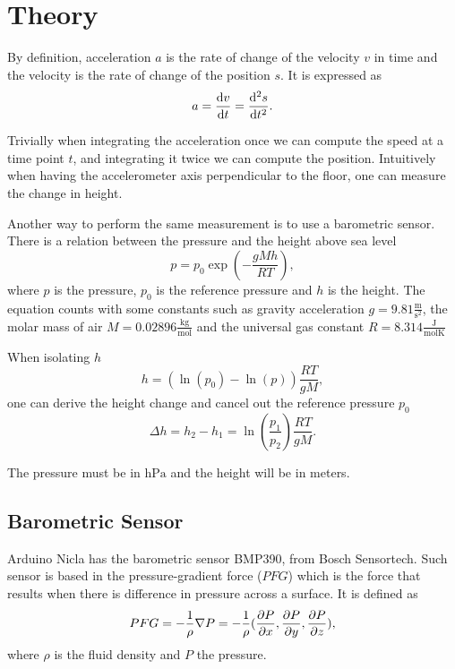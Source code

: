 \documentclass[DIV=14]{scrartcl}
\begin{document}
    \section{Theory}
    By definition, acceleration $a$ is the rate of change of the velocity $v$ in time and the velocity is the rate
    of change of the position $s$.
    It is expressed as
    \begin{equation}
        a = \dv{v}{t} = \dv[2]{s}{t}.
        \label{eq:accelerationDefinition}
    \end{equation}

    Trivially when integrating the acceleration once we can compute the speed at a time point $t$, and integrating
    it twice we can compute the position.
    Intuitively when having the accelerometer axis perpendicular to the floor, one can measure the change in height.

    Another way to perform the same measurement is to use a barometric sensor.
    There is a relation between the pressure and the height above sea level~\cite{labManual}
    \begin{equation}
        p = p_0 \exp(-\frac{gMh}{RT}),
        \label{eq:pressure}
    \end{equation}
    where $p$ is the pressure, $p_0$ is the reference pressure and $h$ is the height.
    The equation counts with some constants such as gravity acceleration $g = 9.81\frac{\mathrm{m}}{\mathrm{s}^2}$,
    the molar mass of air $M = 0.02896\frac{\mathrm{kg}}{\mathrm{mol}}$ and the universal gas constant
    $R = 8.314\frac{\mathrm{J}}{\mathrm{mol}\mathrm{K}}$

    When isolating $h$
    \begin{equation}
        h = (\ln(p_0) - \ln(p))\frac{RT}{gM},
        \label{eq:pressureHeight}
    \end{equation}
    one can derive the height change and cancel out the reference pressure $p_0$
    \begin{equation}
        \Delta h = h_2 - h_1 = \ln(\frac{p_1}{p_2})\frac{RT}{gM}.
        \label{eq:relativePressureHeight}
    \end{equation}

    The pressure must be in $\si{\hecto\pascal}$ and the height will be in meters.

    \subsection{Barometric Sensor}\label{subsec:barometric-sensor}
    Arduino Nicla has the barometric sensor BMP390, from Bosch Sensortech.
    Such sensor is based in the pressure-gradient force ($PFG$) which is the force that results when there is difference in
    pressure across a surface.
    It is defined as~\cite{Hautala}
    \begin{equation}
        PFG = -\frac{1}{\rho}\nabla{P} = -\frac{1}{\rho}(\pdv{P}{x},\pdv{P}{y},\pdv{P}{z})
        \label{eq:pressureGradientForce},
    \end{equation}
    where $\rho$ is the fluid density and $P$ the pressure.
\end{document}
